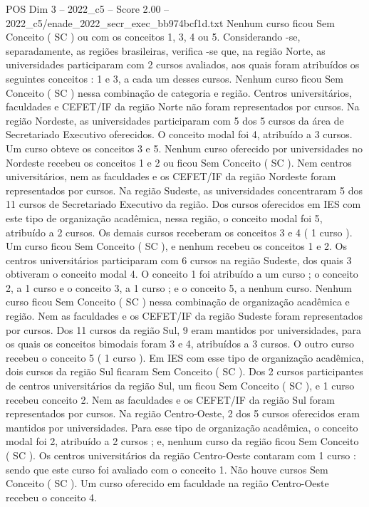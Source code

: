 \begin{textsample}{POS Dim 3 – 2022\_c5 – Score 2.00 – 2022\_c5/enade\_2022\_secr\_exec\_bb974bcf1d.txt}
Nenhum curso ficou Sem Conceito ( SC ) ou com os conceitos 1, 3, 4 ou 5.
Considerando -se, separadamente, as regiões brasileiras, verifica -se que, na região Norte, as universidades participaram com 2 cursos avaliados, aos quais foram atribuídos os seguintes conceitos : 1 e 3, a cada um desses cursos.
Nenhum curso ficou Sem Conceito ( SC ) nessa combinação de categoria e região.
Centros universitários, faculdades e CEFET/IF da região Norte não foram representados por cursos.
Na região Nordeste, as universidades participaram com 5 dos 5 cursos da área de Secretariado Executivo oferecidos.
O conceito modal foi 4, atribuído a 3 cursos.
Um curso obteve os conceitos 3 e 5.
Nenhum curso oferecido por universidades no Nordeste recebeu os conceitos 1 e 2 ou ficou Sem Conceito ( SC ).
Nem centros universitários, nem as faculdades e os CEFET/IF da região Nordeste foram representados por cursos.
Na região Sudeste, as universidades concentraram 5 dos 11 cursos de Secretariado Executivo da região.
Dos cursos oferecidos em IES com este tipo de organização acadêmica, nessa região, o conceito modal foi 5, atribuído a 2 cursos.
Os demais cursos receberam os conceitos 3 e 4 ( 1 curso ).
Um curso ficou Sem Conceito ( SC ), e nenhum recebeu os conceitos 1 e 2.
Os centros universitários participaram com 6 cursos na região Sudeste, dos quais 3 obtiveram o conceito modal 4.
O conceito 1 foi atribuído a um curso ; o conceito 2, a 1 curso e o conceito 3, a 1 curso ; e o conceito 5, a nenhum curso.
Nenhum curso ficou Sem Conceito ( SC ) nessa combinação de organização acadêmica e região.
Nem as faculdades e os CEFET/IF da região Sudeste foram representados por cursos.
Dos 11 cursos da região Sul, 9 eram mantidos por universidades, para os quais os conceitos bimodais foram 3 e 4, atribuídos a 3 cursos.
O outro curso recebeu o conceito 5 ( 1 curso ).
Em IES com esse tipo de organização acadêmica, dois cursos da região Sul ficaram Sem Conceito ( SC ).
Dos 2 cursos participantes de centros universitários da região Sul, um ficou Sem Conceito ( SC ), e 1 curso recebeu conceito 2.
Nem as faculdades e os CEFET/IF da região Sul foram representados por cursos.
Na região Centro-Oeste, 2 dos 5 cursos oferecidos eram mantidos por universidades.
Para esse tipo de organização acadêmica, o conceito modal foi 2, atribuído a 2 cursos ; e, nenhum curso da região ficou Sem Conceito ( SC ).
Os centros universitários da região Centro-Oeste contaram com 1 curso : sendo que este curso foi avaliado com o conceito 1.
Não houve cursos Sem Conceito ( SC ).
Um curso oferecido em faculdade na região Centro-Oeste recebeu o conceito 4.

\end{textsample}
